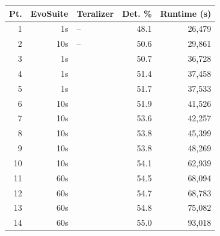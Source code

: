  \begin{tabular}{rrlrr}
  \toprule
  Pt. & EvoSuite & Teralizer & Det. \% & Runtime (s) \\
  \midrule
  1 & 1s & -- & 48.1 & 26,479 \\
  2 & 10s & -- & 50.6 & 29,861 \\
  3 & 1s & \VariantNaiveA{} & 50.7 & 36,728 \\
  4 & 1s & \VariantImprovedB{} & 51.4 & 37,458 \\
  5 & 1s & \VariantNaiveB{} & 51.7 & 37,533 \\
  6 & 10s & \VariantImprovedA{} & 51.9 & 41,526 \\
  7 & 10s & \VariantImprovedB{} & 53.6 & 42,257 \\
  8 & 10s & \VariantNaiveB{} & 53.8 & 45,399 \\
  9 & 10s & \VariantImprovedC{} & 53.8 & 48,269 \\
  10 & 10s & \VariantNaiveC{} & 54.1 & 62,939 \\
  11 & 60s & \VariantImprovedB{} & 54.5 & 68,094 \\
  12 & 60s & \VariantNaiveB{} & 54.7 & 68,783 \\
  13 & 60s & \VariantImprovedC{} & 54.8 & 75,082 \\
  14 & 60s & \VariantNaiveC{} & 55.0 & 93,018 \\
  \bottomrule
  \end{tabular}
